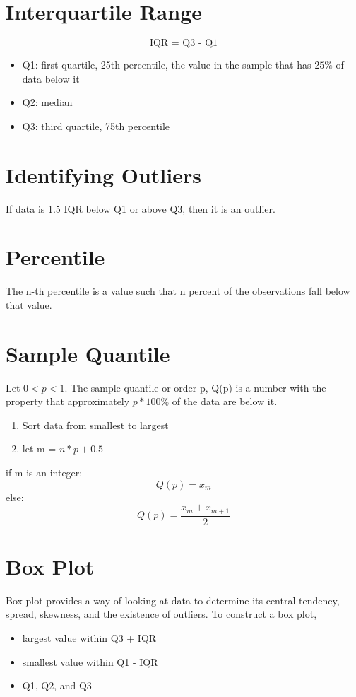 \documentclass{article}
\begin{document}
    \section*{Interquartile Range}
    \begin{equation*}
        \text{IQR = Q3 - Q1}
    \end{equation*}
    \begin{itemize}
        \item Q1: first quartile, 25th percentile, the value in the sample that has $25\%$ of data below it
        \item Q2: median
        \item Q3: third quartile, 75th percentile
    \end{itemize}

    \section*{Identifying Outliers}
    If data is 1.5 IQR below Q1 or above Q3, then it is an outlier.

    \section*{Percentile}
    The n-th percentile is a value such that n percent of the observations fall below that value.

    \section*{Sample Quantile}
    Let $0<p<1$. The sample quantile or order p, Q(p) is a number with the property that approximately $p*100\%$ 
    of the data are below it.

    \begin{enumerate}
        \item Sort data from smallest to largest
        \item let m = $n*p + 0.5$
    \end{enumerate}
    if m is an integer:
    \begin{equation*}
        Q(p) = x_{m}
    \end{equation*}
    else:
    \begin{equation*}
        Q(p) = \frac{x_{m} + {x_{m+1}}}{2}
    \end{equation*}
    
    \section*{Box Plot}
    Box plot provides a way of looking at data to determine its central tendency, spread, skewness,
    and the existence of outliers.
    To construct a box plot,
    \begin{itemize}
        \item largest value within Q3 + IQR
        \item smallest value within Q1 - IQR
        \item Q1, Q2, and Q3
    \end{itemize}
\end{document}
